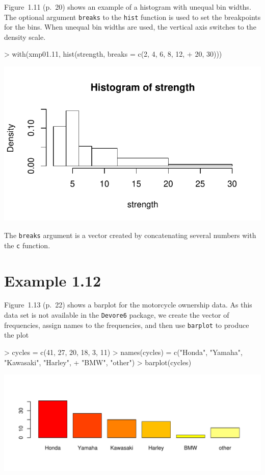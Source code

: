 \documentclass{book}
\begin{document}
Figure~1.11 (p.~20) shows an example of a histogram with unequal bin
widths.  The optional argument \texttt{breaks} to the \texttt{hist}
function is used to set the breakpoints for the bins.  When unequal
bin widths are used, the vertical axis switches to the density scale.
\begin{center}
\begin{Schunk}
\begin{Sinput}
> with(xmp01.11, hist(strength, breaks = c(2, 4, 6, 8, 12, 
+     20, 30)))
\end{Sinput}
\end{Schunk}
\includegraphics{Devore6-xmp0111}
\end{center}
The \texttt{breaks} argument is a vector created by concatenating
several numbers with the \texttt{c} function.


\section{Example 1.12}
\label{sec:xmp01.12}

Figure~1.13 (p.~22) shows a barplot for the motorcycle ownership
data.  As this data set is not available in the \texttt{Devore6}
package, we create the vector of
frequencies, assign names to the frequencies, and then use
\texttt{barplot} to produce the plot
\begin{Schunk}
\begin{Sinput}
> cycles = c(41, 27, 20, 18, 3, 11)
> names(cycles) = c("Honda", "Yamaha", "Kawasaki", "Harley", 
+     "BMW", "other")
> barplot(cycles)
\end{Sinput}
\end{Schunk}
\includegraphics{Devore6-xmp0112}
\end{document}
